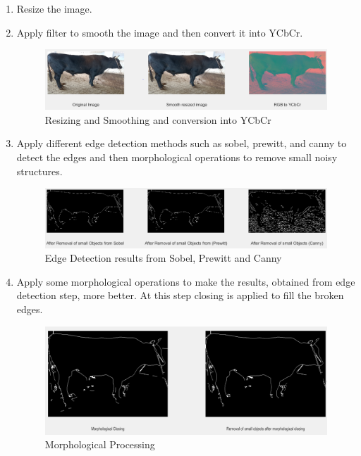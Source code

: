 \documentclass{article}
\begin{document}
\begin{enumerate}
    \item Resize the image.
    \item Apply filter to smooth the image and then convert it into YCbCr.
      \begin{figure}[h]
    \centering
    \includegraphics [scale=0.25] {pre}
    \caption{Resizing and Smoothing and conversion into YCbCr }
    \end{figure}
 
    \item Apply different edge detection methods such as sobel, prewitt, and canny to detect the edges and then morphological operations to remove small noisy structures.
    
      \begin{figure}[h]
    \centering
    \includegraphics [scale=0.25] {mor}
    \caption{Edge Detection results from Sobel, Prewitt and Canny}
    \end{figure}
    
    \item Apply some morphological operations to make the results, obtained from edge detection step, more better. At this step closing is applied to fill the broken edges.
    
     \begin{figure}[h]
    \centering
    \includegraphics [scale=0.35] {morphological_closing_result}
    \caption{Morphological Processing}
    \end{figure}
    
\end{enumerate}
\end{document}
